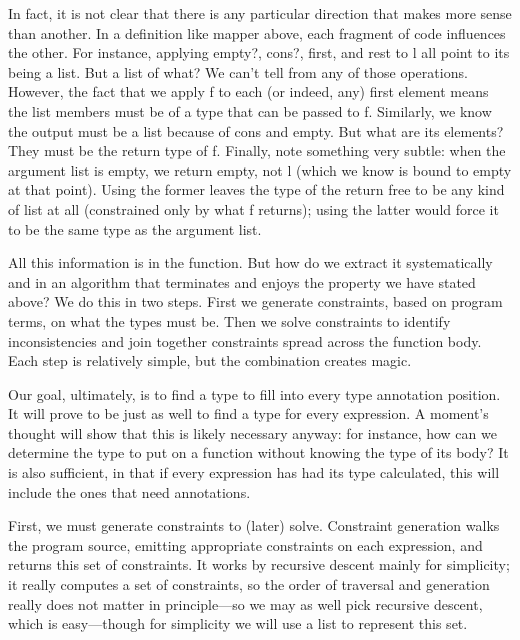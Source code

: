 In fact, it is not clear that there is any particular direction that makes more
sense than another. In a definition like mapper above, each fragment of code
influences the other. For instance, applying empty?, cons?, first, and rest to l
all point to its being a list. But a list of what? We can’t tell from any of
those operations. However, the fact that we apply f to each (or indeed, any)
first element means the list members must be of a type that can be passed to f.
Similarly, we know the output must be a list because of cons and empty. But what
are its elements? They must be the return type of f. Finally, note something
very subtle: when the argument list is empty, we return empty, not l (which we
know is bound to empty at that point). Using the former leaves the type of the
return free to be any kind of list at all (constrained only by what f returns);
using the latter would force it to be the same type as the argument list.

All this information is in the function. But how do we extract it systematically
and in an algorithm that terminates and enjoys the property we have stated
above? We do this in two steps. First we generate constraints, based on program
terms, on what the types must be. Then we solve constraints to identify
inconsistencies and join together constraints spread across the function body.
Each step is relatively simple, but the combination creates magic.

\secdown
{}

Our goal, ultimately, is to find a type to fill into every type annotation
position. It will prove to be just as well to find a type for every expression.
A moment’s thought will show that this is likely necessary anyway: for instance,
how can we determine the type to put on a function without knowing the type of
its body? It is also sufficient, in that if every expression has had its type
calculated, this will include the ones that need annotations.

First, we must generate constraints to (later) solve. Constraint generation
walks the program source, emitting appropriate constraints on each expression,
and returns this set of constraints. It works by recursive descent mainly for
simplicity; it really computes a set of constraints, so the order of traversal
and generation really does not matter in principle—so we may as well pick
recursive descent, which is easy—though for simplicity we will use a list to
represent this set.

